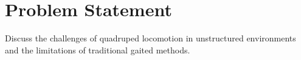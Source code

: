 \section{Problem Statement}

\begin{outline}
  Discuss the challenges of quadruped locomotion in unstructured environments and the limitations of traditional gaited methods.
\end{outline}
